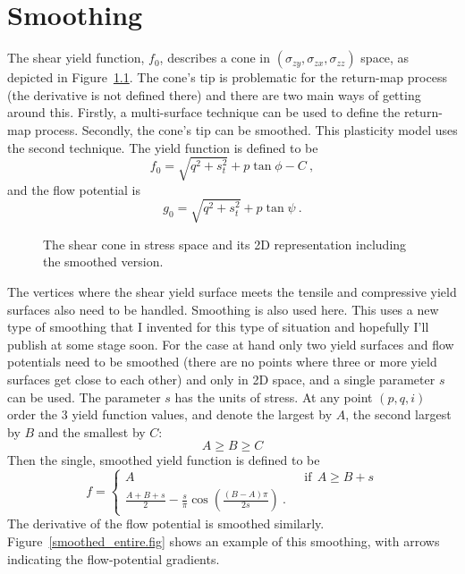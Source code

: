 \documentclass[]{scrreprt}
\begin{document}
\chapter{Smoothing}

The shear yield function, $f_{0}$, describes a cone in $(\sigma_{zy},
\sigma_{zx}, \sigma_{zz})$ space, as depicted in
Figure~\ref{shear.cone.fig}.  The cone's tip is problematic for the
return-map process (the derivative is not defined there) and there are
two main ways of getting around this.  Firstly, a multi-surface
technique can be used to define the return-map process.  Secondly, the
cone's tip can be smoothed.  This plasticity model uses the second
technique.  The yield function is defined to be
\begin{equation}
f_{0} = \sqrt{q^{2} + s_{t}^{2}} + p\tan\phi - C \ ,
\end{equation}
and the flow potential is
\begin{equation}
g_{0} = \sqrt{q^{2} + s_{t}^{2}} + p\tan\psi \ .
\end{equation}

\begin{figure}[htb]
\begin{center}
\caption{The shear cone in stress space and its 2D representation
  including the smoothed version.}
\label{shear.cone.fig}
\end{center}
\end{figure}

The vertices where the shear yield surface meets the tensile and
compressive yield surfaces also need to be handled.  Smoothing is also
used here.  This uses a new type of smoothing that I invented for this
type of situation and hopefully I'll publish at some stage soon.  For
the case at hand only two yield surfaces and flow potentials need to
be smoothed (there are no points where three or more yield surfaces
get close to each other) and only in 2D space, and a single parameter
$s$ can be used.  The parameter $s$ has the units of stress.  At any
point $(p, q, i)$ order the 3 yield function values, and denote the
largest by $A$, the second largest by $B$ and the smallest by $C$:
\begin{equation}
A\geq B\geq C
\end{equation}
Then the single, smoothed yield function is defined to be
\begin{equation}
f = \left\{
\begin{array}{ll}
A & \ \ \ \mbox{if}\ \ A\geq B+s \\
\frac{A+B+s}{2} -
\frac{s}{\pi}\cos\left(\frac{(B-A)\pi}{2s}\right) \ .
\end{array}
\right.
\end{equation}
The derivative of the flow potential is smoothed similarly.
Figure~\ref{smoothed_entire.fig} shows an example of this smoothing,
with arrows indicating the flow-potential gradients.
\end{document}
